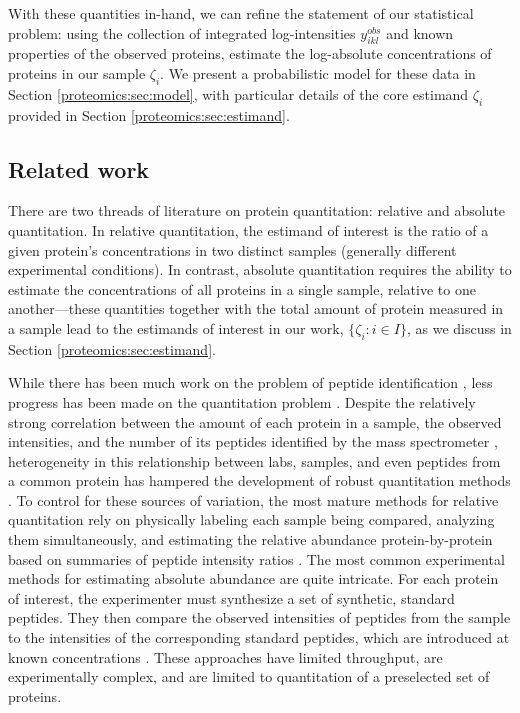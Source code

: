 With these quantities in-hand, we can refine the statement of our statistical problem: using the collection of integrated log-intensities $y_{ikl}^{obs}$ and known properties of the observed proteins, estimate the log-absolute concentrations of proteins in our sample $\zeta_i$.
We present a probabilistic model for these data in Section \ref{proteomics:sec:model}, with particular details of the core estimand $\zeta_i$ provided in Section \ref{proteomics:sec:estimand}.



\subsection{Related work}

There are two threads of literature on protein quantitation: relative and absolute quantitation. 
In relative quantitation, the estimand of interest is the ratio of a given protein's concentrations in two distinct samples  (generally different experimental conditions).
In contrast, absolute quantitation requires the ability to estimate the concentrations of all proteins in a single sample, relative to one another---these quantities together with the total amount of protein measured in a sample lead to the estimands of interest in our work, $\{\zeta_i:i\in I\}$, as we discuss in Section \ref{proteomics:sec:estimand}.


While there has been much work on the problem of peptide identification \citep[e.g.,][]{Cox:2008uu,Perkins:1999ed,Eng:1994fj}, less progress has been made on the quantitation problem \citep{Makawita:2010eg}.
Despite the relatively strong correlation between the amount of each protein in a sample, the observed intensities, and the number of its peptides identified by the mass spectrometer \citep{Old:2005jf}, heterogeneity in this relationship between labs, samples, and even peptides from a common protein has hampered the development of robust quantitation methods \citep{Tabb:2010bc,Bell:2009il}.
To control for these sources of variation, the most mature methods for relative quantitation rely on physically labeling each sample being compared, analyzing them simultaneously, and estimating the relative abundance protein-by-protein based on summaries of peptide intensity ratios \citep{Ong:2002tf}.
%
The most common experimental methods for estimating absolute abundance are quite intricate.
For each protein of interest, the experimenter must synthesize a set of synthetic, standard peptides.
They then compare the observed intensities of peptides from the sample to the intensities of the corresponding standard peptides, which are introduced at known concentrations \citep{Gerber:2003kq}.
These approaches have limited throughput, are experimentally complex, and are limited to quantitation of a preselected set of proteins.

